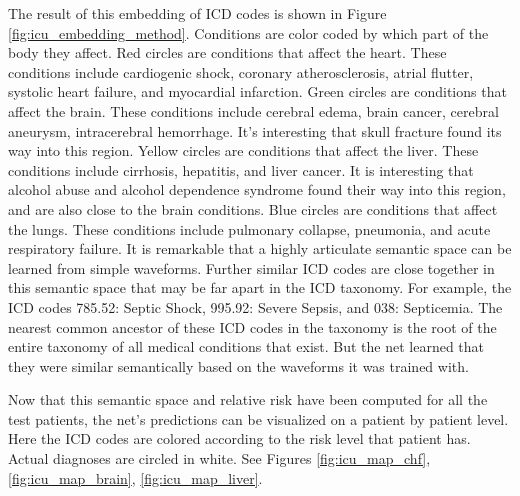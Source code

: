 The result of this embedding of ICD codes is shown in Figure \ref{fig:icu_embedding_method}. Conditions are color coded by which part of the body they affect.  Red circles are conditions that affect the heart.  These conditions include cardiogenic shock, coronary atherosclerosis, atrial flutter, systolic heart failure, and myocardial infarction.  Green circles are conditions that affect the brain.  These conditions include cerebral edema, brain cancer, cerebral aneurysm, intracerebral hemorrhage.  It’s interesting that skull fracture found its way into this region.  Yellow circles are conditions that affect the liver.  These conditions include cirrhosis, hepatitis, and liver cancer.  It is interesting that alcohol abuse and alcohol dependence syndrome found their way into this region, and are also close to the brain conditions.  Blue circles are conditions that affect the lungs.  These conditions include pulmonary collapse, pneumonia, and acute respiratory failure.  It is remarkable that a highly articulate semantic space can be learned from simple waveforms.  Further similar ICD codes are close together in this semantic space that may be far apart in the ICD taxonomy.  For example, the ICD codes 785.52: Septic Shock, 995.92: Severe Sepsis, and 038: Septicemia.  The nearest common ancestor of these ICD codes in the taxonomy is the root of the entire taxonomy of all medical conditions that exist.  But the net learned that they were similar semantically based on the waveforms it was trained with.

Now that this semantic space and relative risk have been computed for all the test patients, the net's predictions can be visualized on a patient by patient level.  Here the ICD codes are colored according to the risk level that patient has.  Actual diagnoses are circled in white.  See Figures \ref{fig:icu_map_chf}, \ref{fig:icu_map_brain}, \ref{fig:icu_map_liver}.

